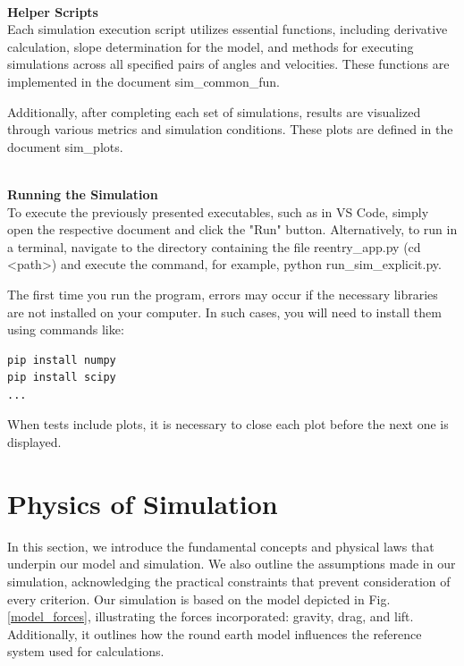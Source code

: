 \documentclass[runningheads]{llncs}
\begin{document}
\noindent \textbf{\\Helper Scripts\\}
Each simulation execution script utilizes essential functions, including derivative calculation, slope determination for the model, and methods for executing simulations across all specified pairs of angles and velocities. These functions are implemented in the document sim\_common\_fun.

Additionally, after completing each set of simulations, results are visualized through various metrics and simulation conditions. These plots are defined in the document sim\_plots.

\noindent \textbf{\\Running the Simulation\\}
To execute the previously presented executables, such as in VS Code, simply open the respective document and click the "Run" button. Alternatively, to run in a terminal, navigate to the directory containing the file reentry\_app.py (cd <path>) and execute the command, for example, python run\_sim\_explicit.py.

The first time you run the program, errors may occur if the necessary libraries are not installed on your computer. In such cases, you will need to install them using commands like:

\begin{verbatim}
pip install numpy
pip install scipy
...
\end{verbatim}

When tests include plots, it is necessary to close each plot before the next one is displayed.













\section{Physics of Simulation}
In this section, we introduce the fundamental concepts and physical laws that underpin our model and simulation. We also outline the assumptions made in our simulation, acknowledging the practical constraints that prevent consideration of every criterion. Our simulation is based on the model depicted in Fig. \ref{model_forces}, illustrating the forces incorporated: gravity, drag, and lift. Additionally, it outlines how the round earth model influences the reference system used for calculations.
\end{document}

